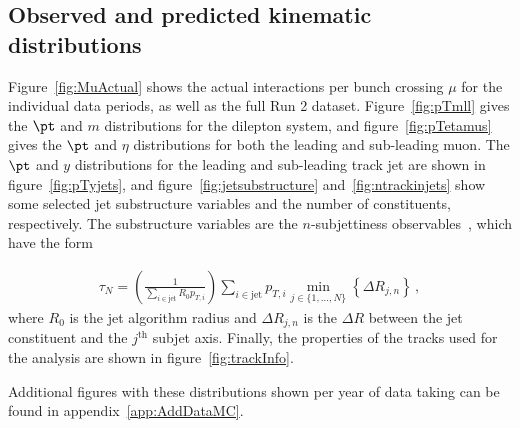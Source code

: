 \subsection{Observed and predicted kinematic distributions}
\label{sec:datamc}
Figure~\ref{fig:MuActual} shows the actual interactions per bunch crossing $\mu$ for the individual data periods, as well as the full Run 2 dataset.
Figure~\ref{fig:pTmll} gives the $\pt$ and $m$ distributions for the dilepton system, and figure~\ref{fig:pTetamus} gives the $\pt$ and $\eta$ distributions for both the leading and sub-leading muon.
The $\pt$ and $y$ distributions for the leading and sub-leading track jet are shown in figure~\ref{fig:pTyjets}, and figure~\ref{fig:jetsubstructure} and~\ref{fig:ntrackinjets} show some
selected jet substructure variables and the number of constituents, respectively.  The substructure variables are the $n$-subjettiness observables~\cite{Thaler:2010tr,Thaler:2011gf}, which have the form

\begin{align}
\tau_N=\left(\frac{1}{\sum_{i\in\text{jet}} R_0p_{T,i}}\right)\sum_{i\in\text{jet}} p_{T,i}\min_{j\in\{1,...,N\}}\left\{\Delta R_{j,n}\right\}\,,
\end{align}
%
where $R_0$ is the jet algorithm radius and $\Delta R_{j,n}$ is the $\Delta R$ between the jet constituent and the $j^\text{th}$ subjet axis. Finally, the properties of the tracks used for the analysis are shown in figure~\ref{fig:trackInfo}.

Additional figures with these distributions shown per year of data taking can be found in appendix~\ref{app:AddDataMC}.

